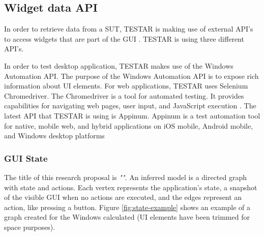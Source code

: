 \subsection{Widget data API}

In order to retrieve data from a SUT, TESTAR is making use of external API's to access widgets that are part of the GUI \cite{thesisMulders}. TESTAR is using three different API's.

In order to test desktop application, TESTAR makes use of the Windows Automation API. The purpose of the Windows Automation API is to expose rich information about UI elements\cite{win-api-info}. For web applications, TESTAR uses Selenium Chromedriver. The Chromedriver is a tool for automated testing. It provides capabilities for navigating web pages, user input, and JavaScript execution \cite{chrome-driver-info}. The latest API that TESTAR is using is Appinum. Appinum is a test automation tool for native, mobile web, and hybrid applications on iOS mobile, Android mobile, and Windows desktop platforms \cite{apinum-info}

\subsubsection{GUI State} \label{gui-state}

The title of this research proposal is \emph{"\thetitle"}. An inferred model is a directed graph with state and actions. Each vertex represents the application's state, a snapshot of the visible GUI when no actions are executed, \cite{gui-history, thesisMulders} and the edges represent an action, like pressing a button. Figure \ref{fig:state-example} shows an example of a graph created for the Windows calculated (UI elements have been trimmed for space purposes).

